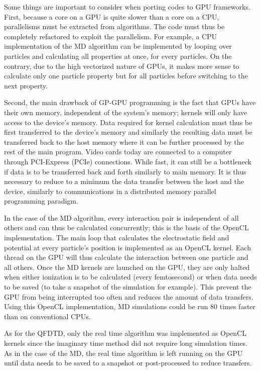 Some things are important to consider when porting codes to GPU frameworks.
First, because a core on a GPU is quite slower than a core on a CPU,
parallelisms must be extracted from algorithms. The code must thus be
completely refactored to exploit the parallelism. For example, a CPU
implementation of the MD algorithm can be implemented by looping over particles
and calculating all properties at once, for every particles. On the contrary,
due to the high vectorized nature of GPUs, it makes more sense to calculate
only one particle property but for all particles before switching to the next
property.

Second, the main drawback of
GP-GPU programming is the fact that GPUs have their own memory, independent of
the system's memory; kernels will only have access to the device's memory. Data
required for kernel calculation must thus be first transferred to the device's
memory and similarly the resulting data must be transferred back to the host
memory where it can be further processed by the rest of the main program. Video
cards today are connected to a computer through PCI-Express (PCIe) connections.
While fast, it can still be a bottleneck if data is to be transferred back and
forth similarly to main memory. It is thus necessary to reduce to a minimum the
data transfer between the host and the device, similarly to communications in a
distributed memory parallel programming paradigm.

In the case of the MD algorithm, every interaction pair is independent of all
others and can thus be calculated concurrently; this is the basis of the
OpenCL implementation. The main loop that calculates the electrostatic field
and potential at every particle's position is implemented as an OpenCL kernel.
Each thread on the GPU will thus calculate the interaction between one particle
and all others. Once the MD kernels are launched on the GPU, they are only
halted when either ionization is to be calculated (every femtosecond) or
when data needs to be saved (to take a snapshot of the simulation for example).
This prevent the GPU from being interrupted too often and reduces the amount of
data transfers. Using this OpenCL implementation, MD simulations could be run
80 times faster than on conventional CPUs.

As for the QFDTD, only the real time algorithm was implemented as OpenCL
kernels since the imaginary time method did not require long simulation times.
As in the case of the MD, the real time algorithm is left running on the GPU
until data needs to be saved to a snapshot or post-processed to reduce
transfers.



